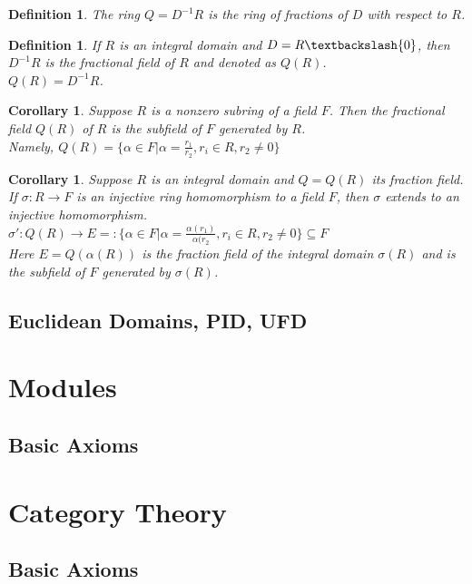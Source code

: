 \documentclass[a4paper,8pt]{article}
\theoremstyle{theorem}
\newtheorem{corollary}[theorem]{Corollary}
\newtheorem{definition}[theorem]{Definition}
\begin{document}
\begin{definition}
The ring $Q = D^{-1}R$ is the \textit{{\color{blue} ring of fractions of $D$ with respect to $R$}}.
\end{definition}

\begin{definition}
If $R$ is an integral domain and $D = R \textbackslash \{0\}$, then $D ^ {-1}R$ is the \textit{{\color{blue} fractional field of $R$}} and denoted as $Q(R)$.\\
$Q(R) = D ^{-1}R$.
\end{definition}

\begin{corollary}
Suppose $R$ is a nonzero subring of a field $F$. Then the fractional field $Q(R)$ of $R$ is the subfield of $F$ generated by $R$.\\
Namely, $Q(R) = \{\alpha \in F | \alpha = \frac{r_1}{r_2}, r_i \in R, r_2 \neq 0\}$
\end{corollary}

\begin{corollary}
Suppose $R$ is an integral domain and $Q = Q(R)$ its fraction field. If $\sigma: R \rightarrow F$ is an injective ring homomorphism to a field $F$, then $\sigma$ extends to an injective homomorphism.\\
$\sigma ' : Q(R) \rightarrow E =: \{\alpha \in F | \alpha = \frac{\alpha(r_1)}{\alpha(r_2}, r_i \in R, r_2 \neq 0\} \subseteq F$\\
Here $E=Q(\alpha(R))$ is the fraction field of the integral domain $\sigma(R)$ and is the subfield of $F$ generated by $\sigma(R)$.
\end{corollary}

\subsection{Euclidean Domains, PID, UFD}

\newpage

\section{Modules}
\subsection{Basic Axioms}

\newpage

\section{Category Theory}
\subsection{Basic Axioms}
\end{document}
